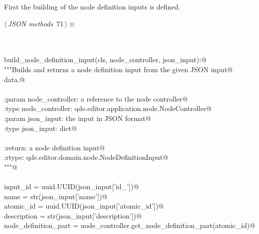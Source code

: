 \documentclass[
    a4paper,      %
    10pt,         %
    openright,    %
    notitlepage,  %
    parskip=half, %
]{scrreprt}       %
\theoremstyle{definition}                    %
\begin{document}
First the building of the node definition inputs is defined.

\begin{flushleft} \small
\begin{minipage}{\linewidth}\label{scrap117}\raggedright\small
{} $\langle\,${\itshape JSON methods}\nobreak\ {\footnotesize {71}}$\,\rangle\equiv$
\vspace{-1exm}
\begin{list}{}{} \item
\mbox{}\lstinline@@\\
\mbox{}\lstinline@classmethod@\\
\mbox{}\lstinline@def build_node_definition_input(cls, node_controller, json_input):@\\
\mbox{}\lstinline@    """Builds and returns a node definition input from the given JSON input@\\
\mbox{}\lstinline@    data.@\\
\mbox{}\lstinline@@\\
\mbox{}\lstinline@    :param node_controller: a reference to the node controller@\\
\mbox{}\lstinline@    :type  node_controller: qde.editor.application.node.NodeController@\\
\mbox{}\lstinline@    :param json_input: the input in JSON format@\\
\mbox{}\lstinline@    :type  json_input: dict@\\
\mbox{}\lstinline@@\\
\mbox{}\lstinline@    :return: a node definition input@\\
\mbox{}\lstinline@    :rtype:  qde.editor.domain.node.NodeDefinitionInput@\\
\mbox{}\lstinline@    """@\\
\mbox{}\lstinline@@\\
\mbox{}\lstinline@    input_id             = uuid.UUID(json_input['id_'])@\\
\mbox{}\lstinline@    name                 = str(json_input['name'])@\\
\mbox{}\lstinline@    atomic_id            = uuid.UUID(json_input['atomic_id'])@\\
\mbox{}\lstinline@    description          = str(json_input['description'])@\\
\mbox{}\lstinline@    node_definition_part = node_controller.get_node_definition_part(atomic_id)@\\
\mbox{}\lstinline@@\\

\end{list}
\end{minipage}
\end{flushleft}
\end{document}
